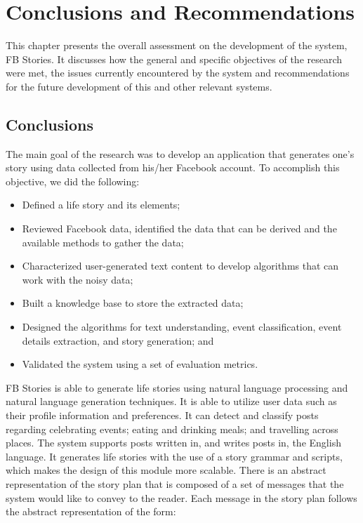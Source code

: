 \chapter{Conclusions and Recommendations}
\label{sec:conclusionsandrecommendations} 
This chapter presents the overall assessment on the development of the system, FB Stories. It discusses how the general and specific objectives of the research were met, the issues currently encountered by the system and recommendations for the future development of this and other relevant systems.

\section{Conclusions}
The main goal of the research was to develop an application that generates one's story using data collected from his/her Facebook account. To accomplish this objective, we did the following: 
\begin{itemize}
	\item Defined a life story and its elements;
	\item Reviewed Facebook data, identified the data that can be derived and the available methods to gather the data;
	\item Characterized user-generated text content to develop algorithms that can work with the noisy data;
	\item Built a knowledge base to store the extracted data;
	\item Designed the algorithms for text understanding, event classification, event details extraction, and story generation; and 
	\item Validated the system using a set of evaluation metrics.
\end{itemize}

FB Stories is able to generate life stories using natural language processing and natural language generation techniques. It is able to utilize user data such as their profile information and preferences.  It can detect and classify posts regarding celebrating events; eating and drinking meals; and travelling across places. The system supports posts written in, and writes posts in, the English language. It generates life stories with the use of a story grammar and scripts, which makes the design of this module more scalable. There is an abstract representation of the story plan that is composed of a set of messages that the system would like to convey to the reader. Each message in the story plan follows the abstract representation of the form:


